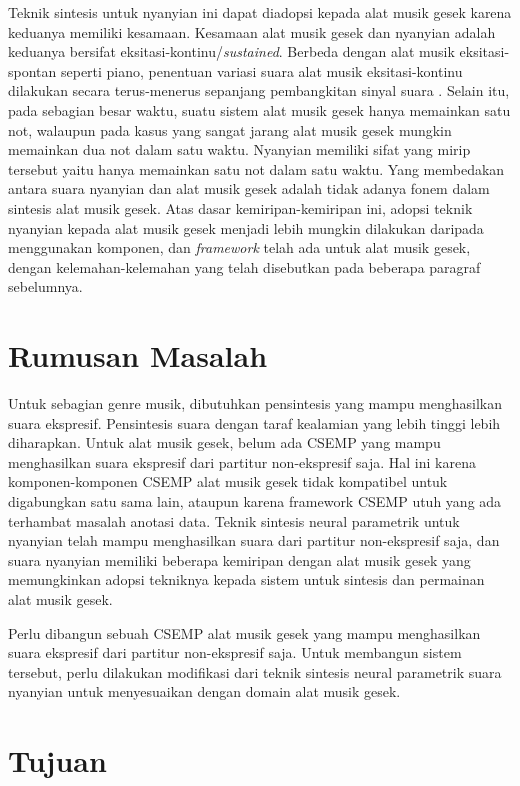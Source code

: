 Teknik sintesis untuk nyanyian ini dapat diadopsi kepada alat musik gesek karena keduanya memiliki kesamaan. Kesamaan alat musik gesek dan nyanyian adalah keduanya bersifat eksitasi-kontinu/\textit{sustained}. Berbeda dengan alat musik eksitasi-spontan seperti piano, penentuan variasi suara alat musik eksitasi-kontinu dilakukan secara terus-menerus sepanjang pembangkitan sinyal suara \parencite{Maestre2010StatisticalMO}. Selain itu, pada sebagian besar waktu, suatu sistem alat musik gesek hanya memainkan satu not, walaupun pada kasus yang sangat jarang alat musik gesek mungkin memainkan dua not dalam satu waktu. Nyanyian memiliki sifat yang mirip tersebut yaitu hanya memainkan satu not dalam satu waktu. Yang membedakan antara suara nyanyian dan alat musik gesek adalah tidak adanya fonem dalam sintesis alat musik gesek. Atas dasar kemiripan-kemiripan ini, adopsi teknik nyanyian kepada alat musik gesek menjadi lebih mungkin dilakukan daripada menggunakan komponen, dan \textit{framework} telah ada untuk alat musik gesek, dengan kelemahan-kelemahan yang telah disebutkan pada beberapa paragraf sebelumnya.

\section{Rumusan Masalah}

Untuk sebagian genre musik, dibutuhkan pensintesis yang mampu menghasilkan suara ekspresif. Pensintesis suara dengan taraf kealamian yang lebih tinggi lebih diharapkan. Untuk alat musik gesek, belum ada CSEMP yang mampu menghasilkan suara ekspresif dari partitur non-ekspresif saja. Hal ini karena komponen-komponen CSEMP alat musik gesek tidak kompatibel untuk digabungkan satu sama lain, ataupun karena framework CSEMP utuh yang ada terhambat masalah anotasi data. Teknik sintesis neural parametrik untuk nyanyian telah mampu menghasilkan suara dari partitur non-ekspresif saja, dan suara nyanyian memiliki beberapa kemiripan dengan alat musik gesek yang memungkinkan adopsi tekniknya kepada sistem untuk sintesis dan permainan alat musik gesek.

Perlu dibangun sebuah CSEMP alat musik gesek yang mampu menghasilkan suara ekspresif dari partitur non-ekspresif saja. Untuk membangun sistem tersebut, perlu dilakukan modifikasi dari teknik sintesis neural parametrik suara nyanyian untuk menyesuaikan dengan domain alat musik gesek.

\section{Tujuan}

